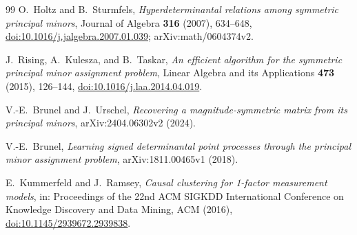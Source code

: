 \begin{thebibliography}{99}
O.~Holtz and B.~Sturmfels,
\emph{Hyperdeterminantal relations among symmetric principal minors},
Journal of Algebra \textbf{316} (2007), 634--648,
\href{https://doi.org/10.1016/j.jalgebra.2007.01.039}{doi:10.1016/j.jalgebra.2007.01.039};
arXiv:math/0604374v2.

J.~Rising, A.~Kulesza, and B.~Taskar,
\emph{An efficient algorithm for the symmetric principal minor assignment
problem},
Linear Algebra and its Applications \textbf{473} (2015), 126--144,
\href{https://doi.org/10.1016/j.laa.2014.04.019}{doi:10.1016/j.laa.2014.04.019}.

V.-E.~Brunel and J.~Urschel,
\emph{Recovering a magnitude-symmetric matrix from its principal minors},
arXiv:2404.06302v2 (2024).

V.-E.~Brunel,
\emph{Learning signed determinantal point processes through the principal
minor assignment problem},
arXiv:1811.00465v1 (2018).

E.~Kummerfeld and J.~Ramsey,
\emph{Causal clustering for 1-factor measurement models},
in: Proceedings of the 22nd ACM SIGKDD International Conference on Knowledge
Discovery and Data Mining, ACM (2016),
\href{https://doi.org/10.1145/2939672.2939838}{doi:10.1145/2939672.2939838}.

\end{thebibliography}
